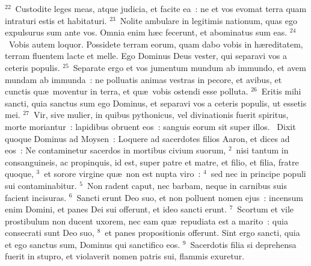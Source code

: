 ${}^{22}$~Custodite leges meas, atque judicia, et facite ea~: ne et vos evomat terra quam intraturi estis et habitaturi.
${}^{23}$~Nolite ambulare in legitimis nationum, quas ego expulsurus sum ante vos. Omnia enim h\ae c fecerunt, et abominatus sum eas.
${}^{24}$~Vobis autem loquor. Possidete terram eorum, quam dabo vobis in h\ae reditatem, terram fluentem lacte et melle. Ego Dominus Deus vester, qui separavi vos a ceteris populis.
${}^{25}$~Separate ergo et vos jumentum mundum ab immundo, et avem mundam ab immunda~: ne polluatis animas vestras in pecore, et avibus, et cunctis qu\ae\ moventur in terra, et qu\ae\ vobis ostendi esse polluta.
${}^{26}$~Eritis mihi sancti, quia sanctus sum ego Dominus, et separavi vos a ceteris populis, ut essetis mei.
${}^{27}$~Vir, sive mulier, in quibus pythonicus, vel divinationis fuerit spiritus, morte moriantur~: lapidibus obruent eos~: sanguis eorum sit super illos.
~Dixit quoque Dominus ad Moysen~: Loquere ad sacerdotes filios Aaron, et dices ad eos~: Ne contaminetur sacerdos in mortibus civium suorum,
${}^{2}$~nisi tantum in consanguineis, ac propinquis, id est, super patre et matre, et filio, et filia, fratre quoque,
${}^{3}$~et sorore virgine qu\ae\ non est nupta viro~:
${}^{4}$~sed nec in principe populi sui contaminabitur.
${}^{5}$~Non radent caput, nec barbam, neque in carnibus suis facient incisuras.
${}^{6}$~Sancti erunt Deo suo, et non polluent nomen ejus~: incensum enim Domini, et panes Dei sui offerunt, et ideo sancti erunt.
${}^{7}$~Scortum et vile prostibulum non ducent uxorem, nec eam qu\ae\ repudiata est a marito~: quia consecrati sunt Deo suo,
${}^{8}$~et panes propositionis offerunt. Sint ergo sancti, quia et ego sanctus sum, Dominus qui sanctifico eos.
${}^{9}$~Sacerdotis filia si deprehensa fuerit in stupro, et violaverit nomen patris sui, flammis exuretur.


